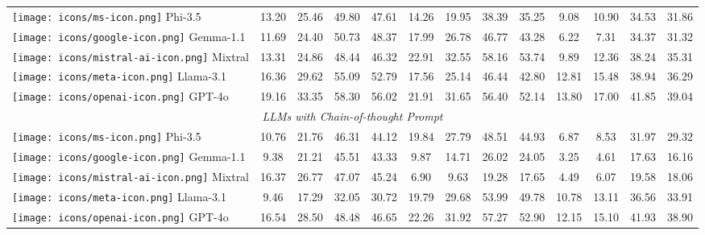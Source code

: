 \begin{table*}[h!]
\begin{tabular}{l|cccc|cccc|cccc}
\texttt{[image: icons/ms-icon.png]} Phi-3.5  & 13.20 & 25.46 & 49.80 & 47.61 & 14.26 & 19.95 & 38.39 & 35.25 & 9.08 & 10.90 & 34.53 & 31.86 \\
\texttt{[image: icons/google-icon.png]} Gemma-1.1 & 11.69 & 24.40 & 50.73 & 48.37 & 17.99 & 26.78 & 46.77 & 43.28 & 6.22 & 7.31 & 34.37 & 31.32 \\
\texttt{[image: icons/mistral-ai-icon.png]} Mixtral & 13.31 & 24.86 & 48.44 & 46.32 & \cellcolor{green!50} 22.91 & \cellcolor{green!50} 32.55 & \cellcolor{green!50} 58.16 & \cellcolor{green!50} 53.74 & 9.89 & 12.36 & 38.24 &  35.31\\
\texttt{[image: icons/meta-icon.png]} Llama-3.1  & 16.36 &  29.62 &  55.09 &  52.79 & 17.56 & 25.14 & 46.44 & 42.80 & \cellcolor{green!15} 12.81 & \cellcolor{green!15} 15.48 & 38.94 & 36.29 \\
\texttt{[image: icons/openai-icon.png]} GPT-4o  & \cellcolor{green!50} 19.16 & \cellcolor{green!50} 33.35 & \cellcolor{green!50} 58.30 & \cellcolor{green!50} 56.02 & 21.91 & 31.65 & 56.40 & 52.14 & \cellcolor{green!50} 13.80 & \cellcolor{green!50} 17.00 & \cellcolor{green!15} 41.85 & \cellcolor{green!50}39.04\\

\midrule
\multicolumn{13}{c}{\textit{LLMs with Chain-of-thought Prompt}}\\
\midrule

\texttt{[image: icons/ms-icon.png]} Phi-3.5  & 10.76 & 21.76 & 46.31 & 44.12 & 19.84 & 27.79 & 48.51 &  44.93 & 6.87 & 8.53 & 31.97 & 29.32 \\
\texttt{[image: icons/google-icon.png]} Gemma-1.1 & 9.38 & 21.21 & 45.51 & 43.33 & 9.87 & 14.71 & 26.02 & 24.05 & 3.25 & 4.61 & 17.63 & 16.16 \\
\texttt{[image: icons/mistral-ai-icon.png]} Mixtral & 16.37 & 26.77 & 47.07 & 45.24 & 6.90 & 9.63 & 19.28 & 17.65 & 4.49 & 6.07 & 19.58 & 18.06\\
\texttt{[image: icons/meta-icon.png]} Llama-3.1  & 9.46 & 17.29 & 32.05 & 30.72 & 19.79 & 29.68 & 53.99 & 49.78 & 10.78 & 13.11 & 36.56 & 33.91 \\
\texttt{[image: icons/openai-icon.png]} GPT-4o  &  16.54 & 28.50 & 48.48 & 46.65 & \cellcolor{green!15} 22.26 & \cellcolor{green!15} 31.92 & \cellcolor{green!15} 57.27 & \cellcolor{green!15} 52.90 & 12.15 & 15.10 & \cellcolor{green!50} 41.93 & \cellcolor{green!15} 38.90\\


\end{tabular}
\end{table*}
